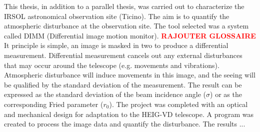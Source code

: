 
This thesis, in addition to a parallel thesis, was carried out to characterize the IRSOL astronomical observation site (Ticino).
The aim is to quantify the atmospheric disturbance at the observation site. \newline
The tool selected was a system called DIMM (Differential image motion monitor). \textbf{\textcolor{red}{RAJOUTER GLOSSAIRE}}
It principle is simple, an image is masked in two to produce a differential measurement.\newline
Differential measurement cancels out any external disturbances that may occur around the telescope (e.g. movements and vibrations).
\bigbreak
Atmospheric disturbance will induce movements in this image, and the seeing will be qualified by the standard deviation of the measurement.
The result can be expressed as the standard deviation of the beam incidence angle ($\sigma$) or as the corresponding Fried parameter ($r_0$).
\bigbreak
The project was completed with an optical and mechanical design for adaptation to the HEIG-VD telescope.
A program was created to process the image data and quantify the disturbance. \newline
The results ...